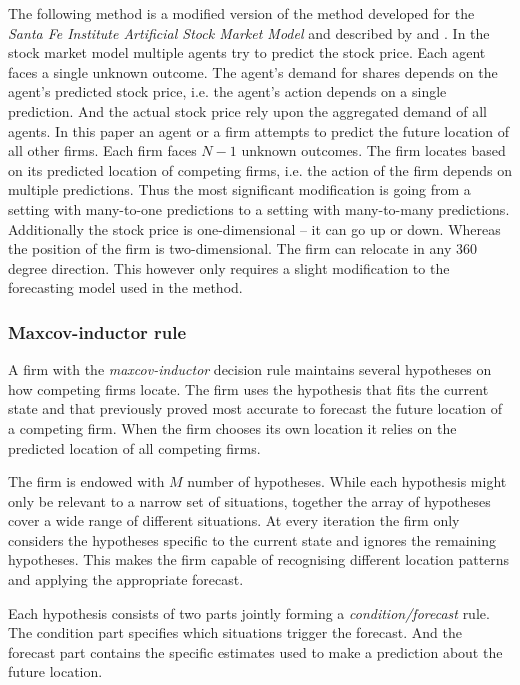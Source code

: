 \documentclass[preprint, 12pt]{elsarticle}
\begin{document}
The following method is a modified version of the method developed for the \emph{Santa Fe Institute Artificial Stock Market Model} and described by \citet[chapter~3]{Arthur_2014} and \citet{Arthur_Holland_LeBaron_Palmer_Tayler_1996}. In the stock market model multiple agents try to predict the stock price. Each agent faces a single unknown outcome. The agent's demand for shares depends on the agent's predicted stock price, i.e. the agent's action depends on a single prediction. And the actual stock price rely upon the aggregated demand of all agents. In this paper an agent or a firm attempts to predict the future location of all other firms. Each firm faces $N-1$ unknown outcomes. The firm locates based on its predicted location of competing firms, i.e. the action of the firm depends on multiple predictions. Thus the most significant modification is going from a setting with many-to-one predictions to a setting with many-to-many predictions. Additionally the stock price is one-dimensional -- it can go up or down. Whereas the position of the firm is two-dimensional. The firm can relocate in any 360 degree direction. This however only requires a slight modification to the forecasting model used in the method.

\subsubsection{Maxcov-inductor rule}
\label{sec:mi}

A firm with the \emph{maxcov-inductor} decision rule maintains several hypotheses on how competing firms locate. The firm uses the hypothesis that fits the current state and that previously proved most accurate to forecast the future location of a competing firm. When the firm chooses its own location it relies on the predicted location of all competing firms.

The firm is endowed with $M$ number of hypotheses. While each hypothesis might only be relevant to a narrow set of situations, together the array of hypotheses cover a wide range of different situations. At every iteration the firm only considers the hypotheses specific to the current state and ignores the remaining hypotheses. This makes the firm capable of recognising different location patterns and applying the appropriate forecast.

Each hypothesis consists of two parts jointly forming a \emph{condition/forecast} rule. The condition part specifies which situations trigger the forecast. And the forecast part contains the specific estimates used to make a prediction about the future location.
\end{document}
